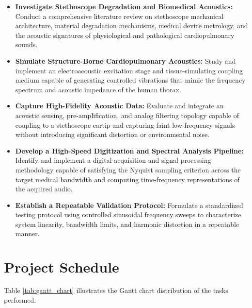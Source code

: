 \begin{itemize}
    \item \textbf{Investigate Stethoscope Degradation and Biomedical Acoustics:} Conduct a comprehensive literature review on stethoscope mechanical architecture, material degradation mechanisms, medical device metrology, and the acoustic signatures of physiological and pathological cardiopulmonary sounds.
    \item \textbf{Simulate Structure-Borne Cardiopulmonary Acoustics:} Study and implement an electroacoustic excitation stage and tissue-simulating coupling medium capable of generating controlled vibrations that mimic the frequency spectrum and acoustic impedance of the human thorax.
    \item \textbf{Capture High-Fidelity Acoustic Data:} Evaluate and integrate an acoustic sensing, pre-amplification, and analog filtering topology capable of coupling to a stethoscope eartip and capturing faint low-frequency signals without introducing significant distortion or environmental noise.
    \item \textbf{Develop a High-Speed Digitization and Spectral Analysis Pipeline:} Identify and implement a digital acquisition and signal processing methodology capable of satisfying the Nyquist sampling criterion across the target medical bandwidth and computing time-frequency representations of the acquired audio.
    \item \textbf{Establish a Repeatable Validation Protocol:} Formulate a standardized testing protocol using controlled sinusoidal frequency sweeps to characterize system linearity, bandwidth limits, and harmonic distortion in a repeatable manner.
\end{itemize}

\section{Project Schedule}

Table \ref{tab:gantt_chart} illustrates the Gantt chart distribution of the tasks performed.

